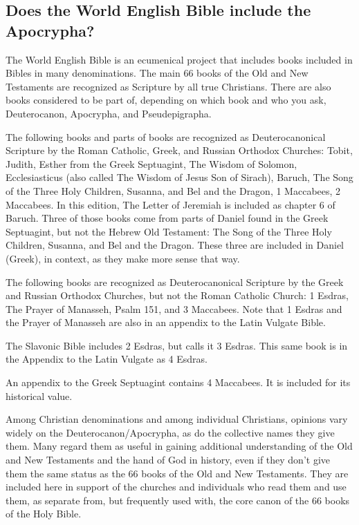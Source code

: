 \hypertarget{does-the-world-english-bible-include-the-apocrypha}{%
\subsection{Does the World English Bible include the
Apocrypha?}\label{does-the-world-english-bible-include-the-apocrypha}}

The World English Bible is an ecumenical project that includes books
included in Bibles in many denominations. The main 66 books of the Old
and New Testaments are recognized as Scripture by all true Christians.
There are also books considered to be part of, depending on which book
and who you ask, Deuterocanon, Apocrypha, and Pseudepigrapha.

The following books and parts of books are recognized as
Deuterocanonical Scripture by the Roman Catholic, Greek, and Russian
Orthodox Churches: Tobit, Judith, Esther from the Greek Septuagint, The
Wisdom of Solomon, Ecclesiasticus (also called The Wisdom of Jesus Son
of Sirach), Baruch, The Song of the Three Holy Children, Susanna, and
Bel and the Dragon, 1 Maccabees, 2 Maccabees. In this edition, The
Letter of Jeremiah is included as chapter 6 of Baruch. Three of those
books come from parts of Daniel found in the Greek Septuagint, but not
the Hebrew Old Testament: The Song of the Three Holy Children, Susanna,
and Bel and the Dragon. These three are included in Daniel (Greek), in
context, as they make more sense that way.

The following books are recognized as Deuterocanonical Scripture by the
Greek and Russian Orthodox Churches, but not the Roman Catholic Church:
1 Esdras, The Prayer of Manasseh, Psalm 151, and 3 Maccabees. Note that
1 Esdras and the Prayer of Manasseh are also in an appendix to the Latin
Vulgate Bible.

The Slavonic Bible includes 2 Esdras, but calls it 3 Esdras. This same
book is in the Appendix to the Latin Vulgate as 4 Esdras.

An appendix to the Greek Septuagint contains 4 Maccabees. It is included
for its historical value.

Among Christian denominations and among individual Christians, opinions
vary widely on the Deuterocanon/Apocrypha, as do the collective names
they give them. Many regard them as useful in gaining additional
understanding of the Old and New Testaments and the hand of God in
history, even if they don't give them the same status as the 66 books of
the Old and New Testaments. They are included here in support of the
churches and individuals who read them and use them, as separate from,
but frequently used with, the core canon of the 66 books of the Holy
Bible.

